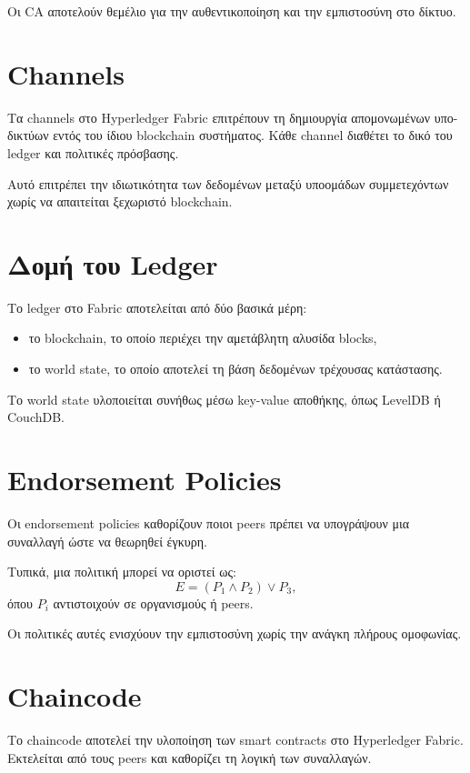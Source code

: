 \documentclass[12pt,a4paper]{report}
\begin{document}
Οι CA αποτελούν θεμέλιο για την αυθεντικοποίηση και την εμπιστοσύνη στο δίκτυο.

\section{Channels}

Τα channels στο Hyperledger Fabric επιτρέπουν τη δημιουργία απομονωμένων υπο-δικτύων εντός του ίδιου blockchain συστήματος. Κάθε channel διαθέτει το δικό του ledger και πολιτικές πρόσβασης.

Αυτό επιτρέπει την ιδιωτικότητα των δεδομένων μεταξύ υποομάδων συμμετεχόντων χωρίς να απαιτείται ξεχωριστό blockchain.

\section{Δομή του Ledger}

Το ledger στο Fabric αποτελείται από δύο βασικά μέρη:

\begin{itemize}
    \item το blockchain, το οποίο περιέχει την αμετάβλητη αλυσίδα blocks,
    \item το world state, το οποίο αποτελεί τη βάση δεδομένων τρέχουσας κατάστασης.
\end{itemize}

Το world state υλοποιείται συνήθως μέσω key-value αποθήκης, όπως LevelDB ή CouchDB.

\section{Endorsement Policies}

Οι endorsement policies καθορίζουν ποιοι peers πρέπει να υπογράψουν μια συναλλαγή ώστε να θεωρηθεί έγκυρη.

Τυπικά, μια πολιτική μπορεί να οριστεί ως:
\[
E = (P_1 \wedge P_2) \vee P_3,
\]
όπου $P_i$ αντιστοιχούν σε οργανισμούς ή peers.

Οι πολιτικές αυτές ενισχύουν την εμπιστοσύνη χωρίς την ανάγκη πλήρους ομοφωνίας.

\section{Chaincode}

Το chaincode αποτελεί την υλοποίηση των smart contracts στο Hyperledger Fabric. Εκτελείται από τους peers και καθορίζει τη λογική των συναλλαγών.
\end{document}
